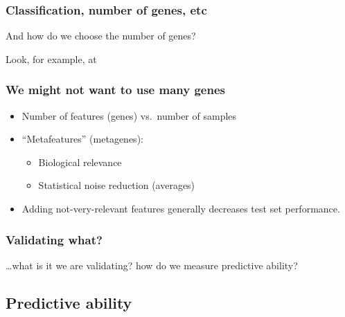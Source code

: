 \begin{frame}
\frametitle{Classification, number of genes, etc}
And how do we choose the number of genes?

\vspace*{15pt}
Look, for example, at 
\end{frame}




\begin{frame}
  \frametitle{We might not want to use many genes}
  \begin{itemize}
  \item Number of features (genes) vs.\ number of samples
  \item ``Metafeatures'' (metagenes):
    \begin{itemize}
    \item Biological relevance
    \item Statistical noise reduction (averages)
    \end{itemize}
  \item Adding not-very-relevant features generally decreases test set performance.
  \end{itemize}
\end{frame}


\begin{frame}
\frametitle{Validating what?}
\ldots what is it we are validating? how do we measure predictive ability?


\end{frame}


\subsection[Predictive ability]{Predictive ability}




